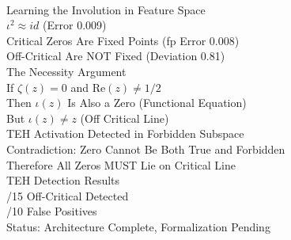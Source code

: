 \documentclass[11pt]{article}
\begin{document}
\vspace{6pt}
\\
\quad Learning the Involution in Feature Space\\
\quad \quad $\iota^2 \approx id$ (Error 0.009)\\
\quad \quad Critical Zeros Are Fixed Points (fp Error 0.008)\\
\quad \quad Off-Critical Are NOT Fixed (Deviation 0.81)\\
\quad The Necessity Argument\\
\quad \quad If $\zeta(z) = 0$ and $\mathrm{Re}(z) \neq 1/2$\\
\quad \quad Then $\iota(z)$ Is Also a Zero (Functional Equation)\\
\quad \quad But $\iota(z) \neq z$ (Off Critical Line)\\
\quad \quad TEH Activation Detected in Forbidden Subspace\\
\quad \quad Contradiction: Zero Cannot Be Both True and Forbidden\\
\quad \quad Therefore All Zeros MUST Lie on Critical Line\\
\quad TEH Detection Results\\
\quad {}/15 Off-Critical Detected\\
\quad {}/10 False Positives\\
\quad Status: Architecture Complete, Formalization Pending\\
\end{document}
